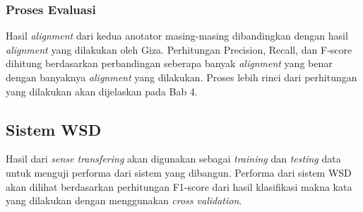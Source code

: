 \subsubsection{Proses Evaluasi}

Hasil \textit{alignment} dari kedua anotator masing-masing dibandingkan dengan hasil \textit{alignment} yang dilakukan oleh Giza. Perhitungan Precision, Recall, dan F-score dihitung berdasarkan perbandingan seberapa banyak \textit{alignment} yang benar dengan banyaknya \textit{alignment} yang dilakukan. Proses lebih rinci dari perhitungan yang dilakukan akan dijelaskan pada Bab 4.

\subsection{Sistem WSD}
Hasil dari \textit{sense transfering} akan digunakan sebagai \textit{training} dan \textit{testing} data untuk menguji performa dari sistem yang dibangun. Performa dari sistem WSD akan dilihat berdasarkan perhitungan F1-score dari hasil klasifikasi makna kata yang dilakukan dengan menggunakan \textit{cross validation}.